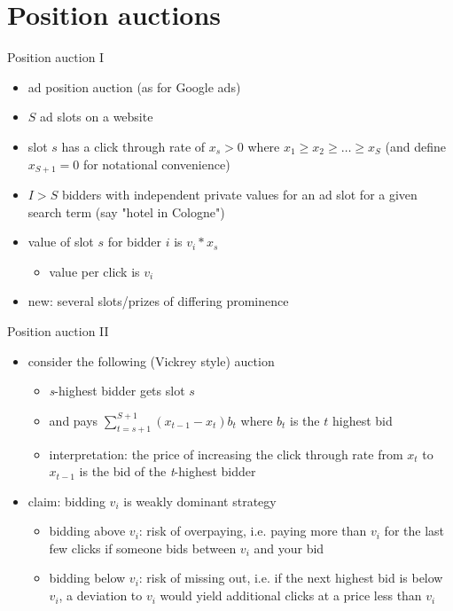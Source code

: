 \documentclass[bigger]{beamer}
\begin{document}
\section{Position auctions}
\label{sec:orga32357d}
\begin{frame}[label={sec:orga48f3ef}]{Position auction I}
\begin{itemize}
\item ad position auction (as for Google ads)
\item \(S\) ad slots on a website
\item slot \(s\) has a click through rate of \(x_s>0\) where \(x_1\geq x_2\geq\dots\geq x_S\) (and define \(x_{S+1}=0\) for notational convenience)
\item \(I>S\) bidders with independent private values for an ad slot for a given search term (say "hotel in Cologne")
\item value of slot \(s\) for bidder \(i\) is \(v_i*x_s\)
\begin{itemize}
\item value per click is \(v_i\)
\end{itemize}
\vspace*{0.5cm}
\item new: several slots/prizes of differing prominence
\end{itemize}
\end{frame}
\begin{frame}[label={sec:org050c125}]{Position auction II}
\begin{itemize}
\item consider the following (Vickrey style) auction
\begin{itemize}
\item \emph{s}-highest bidder gets slot \(s\)
\item and pays \(\sum_{t=s+1}^{S+1} (x_{t-1}-x_{t})b_t\) where \(b_t\) is the \(t\) highest bid
\item interpretation: the price of increasing the click through rate from \(x_t\) to \(x_{t-1}\) is the bid of the \emph{t}-highest bidder
\end{itemize}
\item claim: bidding \(v_i\) is weakly dominant strategy
\begin{itemize}
\item bidding above \(v_i\): risk of overpaying, i.e. paying more than \(v_i\) for the last few clicks if someone bids between \(v_i\) and your bid
\item bidding below \(v_i\): risk of missing out, i.e. if the next highest bid is below \(v_i\), a deviation to \(v_i\) would yield additional clicks at a price less than \(v_i\)
\end{itemize}
\end{itemize}
\end{frame}
\end{document}
